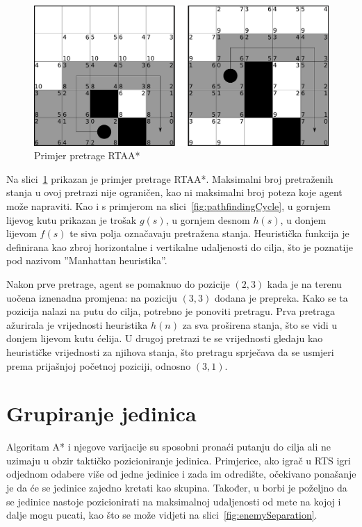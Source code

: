 \documentclass[times, utf8, zavrsni, numeric]{fer}
\begin{document}
\begin{figure}[h]
	\centering
	\includegraphics[width=0.9\linewidth]{images/rtaastar.pdf}
	\caption{Primjer pretrage RTAA*\cite{article:RTAAStar}}
	\label{fig:rtaastar}
\end{figure}

\par Na slici~\ref{fig:rtaastar} prikazan je primjer pretrage RTAA*.
Maksimalni broj pretraženih stanja u ovoj pretrazi nije ograničen, kao ni maksimalni broj poteza koje agent može napraviti.
Kao i s primjerom na slici~\ref{fig:pathfindingCycle}, u gornjem lijevog kutu prikazan je trošak \(g(s)\), u gornjem desnom \(h(s)\), u donjem lijevom \(f(s)\) te siva polja označavaju pretražena stanja.
Heuristička funkcija je definirana kao zbroj horizontalne i vertikalne udaljenosti do cilja, što je poznatije pod nazivom ''Manhattan heuristika''.

\par Nakon prve pretrage, agent se pomaknuo do pozicije \((2, 3)\) kada je na  terenu uočena iznenadna promjena: na poziciju \((3, 3)\) dodana je prepreka.
Kako se ta pozicija nalazi na putu do cilja, potrebno je ponoviti pretragu.
Prva pretraga ažurirala je vrijednosti heuristika \(h(n)\) za sva proširena stanja, što se vidi u donjem lijevom kutu ćelija.
U drugoj pretrazi te se vrijednosti gledaju kao heurističke vrijednosti za njihova stanja, što pretragu sprječava da se usmjeri prema prijašnjoj početnoj poziciji, odnosno \((3, 1)\).

\section{Grupiranje jedinica}\label{sec:grouping}

\par Algoritam A* i njegove varijacije su sposobni pronaći putanju do cilja ali ne uzimaju u obzir taktičko pozicioniranje jedinica. 
Primjerice, ako igrač u RTS igri odjednom odabere više od jedne jedinice i zada im odredište, očekivano ponašanje je da će se jedinice zajedno kretati kao skupina. 
Također, u borbi je poželjno da se jedinice nastoje pozicionirati na maksimalnoj udaljenosti od mete na kojoj i dalje mogu pucati, kao što se može vidjeti na slici~\ref{fig:enemySeparation}.
\end{document}
